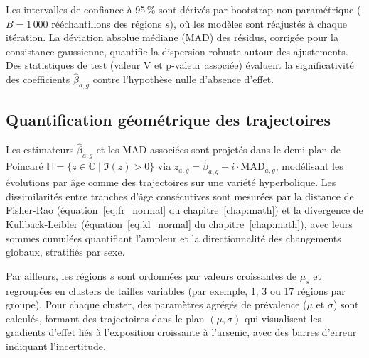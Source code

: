 Les intervalles de confiance à 95\,\% sont dérivés par bootstrap non paramétrique ($B = 1\,000$ rééchantillons des régions $s$), où les modèles sont réajustés à chaque itération. La déviation absolue médiane (MAD) des résidus, corrigée pour la consistance gaussienne, quantifie la dispersion robuste autour des ajustements. Des statistiques de test (valeur V et p-valeur associée) évaluent la significativité des coefficients $\hat{\beta}_{a,g}$ contre l'hypothèse nulle d'absence d'effet.

\subsection{Quantification géométrique des trajectoires}
Les estimateurs $\hat{\beta}_{a,g}$ et les MAD associées sont projetés dans le demi-plan de Poincaré $\mathbb{H} = \{ z \in \mathbb{C} \mid \Im(z) > 0 \}$ via $z_{a,g} = \hat{\beta}_{a,g} + i \cdot \mathrm{MAD}_{a,g}$, modélisant les évolutions par âge comme des trajectoires sur une variété hyperbolique. Les dissimilarités entre tranches d'âge consécutives sont mesurées par la distance de Fisher-Rao (équation~\eqref{eq:fr_normal} du chapitre~\ref{chap:math}) et la divergence de Kullback-Leibler (équation~\eqref{eq:kl_normal} du chapitre~\ref{chap:math}), avec leurs sommes cumulées quantifiant l'ampleur et la directionnalité des changements globaux, stratifiés par sexe.

Par ailleurs, les régions $s$ sont ordonnées par valeurs croissantes de $\mu_s$ et regroupées en clusters de tailles variables (par exemple, 1, 3 ou 17 régions par groupe). Pour chaque cluster, des paramètres agrégés de prévalence ($\mu$ et $\sigma$) sont calculés, formant des trajectoires dans le plan $(\mu, \sigma)$ qui visualisent les gradients d'effet liés à l'exposition croissante à l'arsenic, avec des barres d'erreur indiquant l'incertitude.